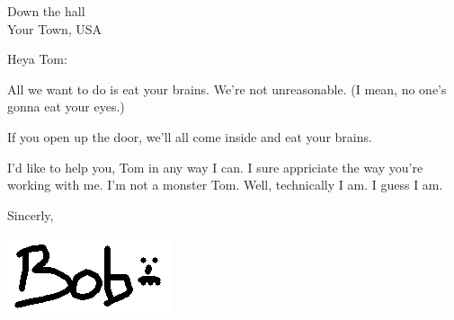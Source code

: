 \documentclass{letter}
\begin{document}
\longindentation=0pt

\begin{letter}{  Down the hall \\ Your Town, USA }

\opening{  Heya Tom: }


All we want to do is eat your brains. We're not unreasonable. (I mean,
no one's gonna eat your eyes.)

If you open up the door, we'll all come inside and eat your brains.

I'd like to help you, Tom in any way I can. I sure appriciate the way
you're working with me. I'm not a monster Tom. Well, technically I am. I
guess I am.




\vspace{1 em}

\closing{Sincerly,}



\vspace{-.85in}
\includegraphics[scale=.4]{example/bob_sig.png}



\end{letter}
\end{document}

